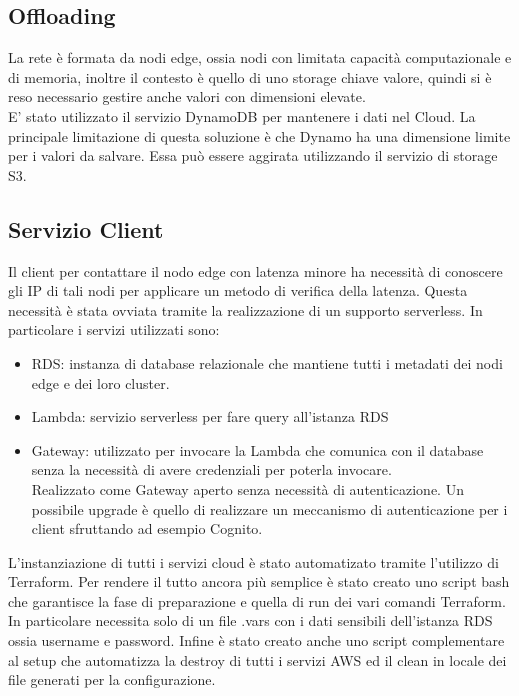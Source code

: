 \documentclass[conference]{IEEEtran}
\begin{document}
\subsection{Offloading}
La rete è formata da nodi edge, ossia nodi con limitata capacità computazionale e di memoria, inoltre il contesto
è quello di uno storage chiave valore, quindi si è reso necessario gestire anche valori con dimensioni elevate.\\
E' stato utilizzato il servizio DynamoDB per mantenere i dati nel Cloud.
La principale limitazione di questa soluzione è che Dynamo ha una dimensione limite per i valori da salvare.
Essa può essere aggirata utilizzando il servizio di storage S3.

\subsection{Servizio Client}
Il client per contattare il nodo edge con latenza minore ha necessità di conoscere gli IP di tali nodi per applicare un
metodo di verifica della latenza. Questa necessità è stata ovviata tramite la realizzazione di un supporto serverless.
In particolare i servizi utilizzati sono:
\begin{itemize}
  \item {RDS: }instanza di database relazionale che mantiene tutti i metadati dei nodi edge e dei loro cluster.
  \item {Lambda: }servizio serverless per fare query all'istanza RDS
  \item {Gateway: }utilizzato per invocare la Lambda che comunica con il database senza la necessità di avere credenziali
                  per poterla invocare.\\
                  Realizzato come Gateway aperto senza necessità di autenticazione.
                  Un possibile upgrade è quello di realizzare un meccanismo di autenticazione per i client sfruttando
                  ad esempio Cognito.
\end{itemize}
L'instanziazione di tutti i servizi cloud è stato automatizato tramite l'utilizzo di Terraform.
Per rendere il tutto ancora più semplice è stato creato uno script bash che garantisce la fase di preparazione e quella di run dei vari comandi Terraform.
In particolare necessita solo di un file .vars con i dati sensibili dell'istanza RDS ossia username e password.
Infine è stato creato anche uno script complementare al setup che automatizza la destroy di tutti i servizi AWS ed il clean in locale dei file
generati per la configurazione.
\end{document}
